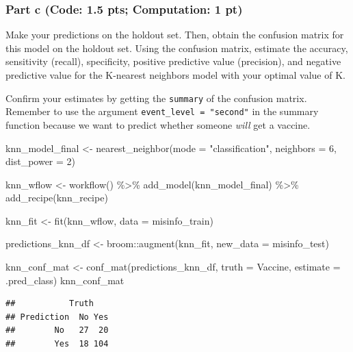 \documentclass[
]{article}
\newenvironment{Shaded}{\begin{snugshade}}{\end{snugshade}}
\newcommand{\AttributeTok}[1]{\textcolor[rgb]{0.77,0.63,0.00}{#1}}
\newcommand{\DecValTok}[1]{\textcolor[rgb]{0.00,0.00,0.81}{#1}}
\newcommand{\FunctionTok}[1]{\textcolor[rgb]{0.00,0.00,0.00}{#1}}
\newcommand{\NormalTok}[1]{#1}
\newcommand{\OtherTok}[1]{\textcolor[rgb]{0.56,0.35,0.01}{#1}}
\newcommand{\SpecialCharTok}[1]{\textcolor[rgb]{0.00,0.00,0.00}{#1}}
\newcommand{\StringTok}[1]{\textcolor[rgb]{0.31,0.60,0.02}{#1}}
\begin{document}
\hypertarget{part-c-code-1.5-pts-computation-1-pt}{%
\subsubsection{Part c (Code: 1.5 pts; Computation: 1
pt)}\label{part-c-code-1.5-pts-computation-1-pt}}

Make your predictions on the holdout set. Then, obtain the confusion
matrix for this model on the holdout set. Using the confusion matrix,
estimate the accuracy, sensitivity (recall), specificity, positive
predictive value (precision), and negative predictive value for the
K-nearest neighbors model with your optimal value of K.

Confirm your estimates by getting the \texttt{summary} of the confusion
matrix. Remember to use the argument \texttt{event\_level\ =\ "second"}
in the summary function because we want to predict whether someone
\emph{will} get a vaccine.

\begin{Shaded}
\begin{Highlighting}[]
\NormalTok{knn\_model\_final }\OtherTok{\textless{}{-}} \FunctionTok{nearest\_neighbor}\NormalTok{(}\AttributeTok{mode =} \StringTok{"classification"}\NormalTok{, }\AttributeTok{neighbors =} \DecValTok{6}\NormalTok{, }\AttributeTok{dist\_power =} \DecValTok{2}\NormalTok{)}

\NormalTok{knn\_wflow }\OtherTok{\textless{}{-}} \FunctionTok{workflow}\NormalTok{() }\SpecialCharTok{\%\textgreater{}\%}
  \FunctionTok{add\_model}\NormalTok{(knn\_model\_final) }\SpecialCharTok{\%\textgreater{}\%}
  \FunctionTok{add\_recipe}\NormalTok{(knn\_recipe)}


\NormalTok{knn\_fit }\OtherTok{\textless{}{-}} \FunctionTok{fit}\NormalTok{(knn\_wflow, }\AttributeTok{data =}\NormalTok{ misinfo\_train)}

\NormalTok{predictions\_knn\_df }\OtherTok{\textless{}{-}}\NormalTok{ broom}\SpecialCharTok{::}\FunctionTok{augment}\NormalTok{(knn\_fit, }\AttributeTok{new\_data =}\NormalTok{ misinfo\_test)}

\NormalTok{knn\_conf\_mat }\OtherTok{\textless{}{-}} \FunctionTok{conf\_mat}\NormalTok{(predictions\_knn\_df, }\AttributeTok{truth =}\NormalTok{ Vaccine, }\AttributeTok{estimate =}\NormalTok{ .pred\_class)}
\NormalTok{knn\_conf\_mat}
\end{Highlighting}
\end{Shaded}

\begin{verbatim}
##           Truth
## Prediction  No Yes
##        No   27  20
##        Yes  18 104
\end{verbatim}
\end{document}
